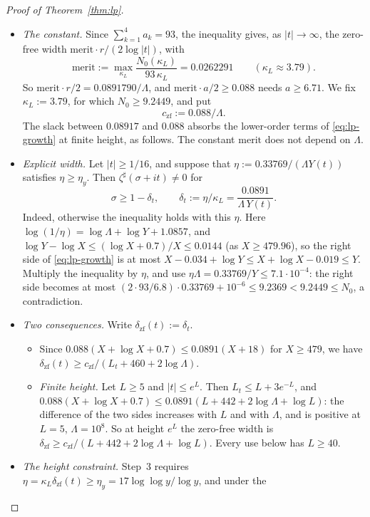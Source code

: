 \begin{proof}[Proof of Theorem~\ref{thm:lp}]
\begin{itemize}
\[    N_0(\kappa_L):=\frac{56\kappa_L}{\kappa_L+1}-35(1+10^{-8})-128\eps_f .
  \]
\item \emph{The constant.} Since $\sum_{k=1}^4a_k=93$, the inequality gives, as $|t|\to\infty$, the zero-free width
  $\mathrm{merit}\cdot r/(2\log|t|)$, with
  \[
    \mathrm{merit}:=\max_{\kappa_L}\frac{N_0(\kappa_L)}{93\,\kappa_L}=0.0262291\qquad(\kappa_L\approx3.79).
  \]
  So $\mathrm{merit}\cdot r/2=0.0891790/\Lambda$, and $\mathrm{merit}\cdot a/2\ge0.088$ needs $a\ge6.71$. We fix $\kappa_L:=3.79$,
  for which $N_0\ge9.2449$, and put
  \[
    c_{\mathrm{zf}}:=0.088/\Lambda .
  \]
  The slack between $0.08917$ and $0.088$ absorbs the lower-order terms of \eqref{eq:lp-growth} at finite height, as follows.
  The constant $\mathrm{merit}$ does not depend on $\Lambda$.
\item \emph{Explicit width.} Let $|t|\ge1/16$, and suppose that $\eta:=0.33769/(\Lambda Y(t))$ satisfies $\eta\ge\eta_y$. Then
  $\zeta^\sharp(\sigma+it)\ne0$ for
  \begin{equation}\label{eq:lp-width}
    \sigma\ge1-\delta_t,\qquad\delta_t:=\eta/\kappa_L=\frac{0.0891}{\Lambda\,Y(t)} .
  \end{equation}
  Indeed, otherwise the inequality holds with this $\eta$. Here $\log(1/\eta)=\log\Lambda+\log Y+1.0857$, and
  $\log Y-\log X\le(\log X+0.7)/X\le0.0144$ (as $X\ge479.96$), so the right side of \eqref{eq:lp-growth} is at most
  $X-0.034+\log Y\le X+\log X-0.019\le Y$.
  Multiply the inequality by $\eta$, and use $\eta\Lambda=0.33769/Y\le7.1\cdot10^{-4}$: the right side becomes at most
  $(2\cdot93/6.8)\cdot0.33769+10^{-6}\le9.2369<9.2449\le N_0$, a contradiction.
\item \emph{Two consequences.} Write $\delta_{\mathrm{zf}}(t):=\delta_t$.
  \begin{itemize}
  \item Since $0.088(X+\log X+0.7)\le0.0891(X+18)$ for $X\ge479$, we have $\delta_{\mathrm{zf}}(t)\ge c_{\mathrm{zf}}/(L_t+460+2\log\Lambda)$.
  \item \emph{Finite height.} Let $L\ge5$ and $|t|\le e^L$. Then $L_t\le L+3e^{-L}$, and
    $0.088(X+\log X+0.7)\le0.0891(L+442+2\log\Lambda+\log L)$: the difference of the two sides increases with $L$ and with
    $\Lambda$, and is positive at $L=5$, $\Lambda=10^8$. So at height $e^L$ the zero-free width is
    $\delta_{\mathrm{zf}}\ge c_{\mathrm{zf}}/(L+442+2\log\Lambda+\log L)$. Every use below has $L\ge40$.
  \end{itemize}
\item \emph{The height constraint.} Step~3 requires $\eta=\kappa_L\delta_{\mathrm{zf}}(t)\ge\eta_y=17\log\log y/\log y$, and under the

\end{itemize}
\end{proof}
